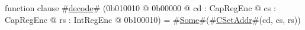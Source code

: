 function clause #\hyperref[zdecode]{decode}# (0b010010 @ 0b00000 @ cd : CapRegEnc @ cs : CapRegEnc @ rs : IntRegEnc @ 0b100010) = #\hyperref[zSome]{Some}#(#\hyperref[zCSetAddr]{CSetAddr}#(cd, cs, rs))

